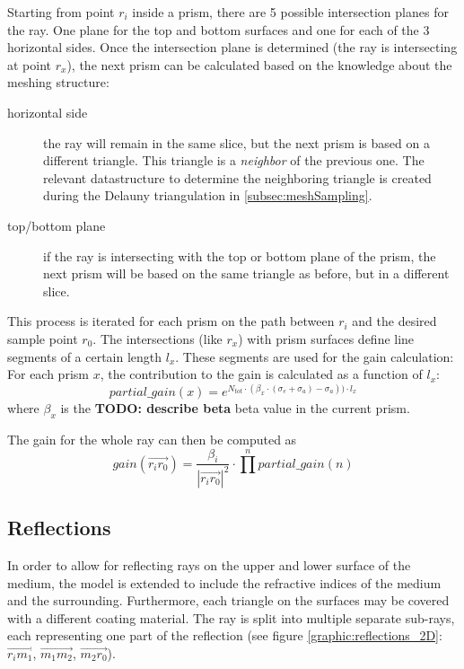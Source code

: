 Starting from point $r_i$ inside a prism, there are 5 possible intersection
planes for the ray. One plane for the top and bottom surfaces and one for each
of the 3 horizontal sides. Once the intersection plane is determined (the ray is
intersecting at point $r_x$), the next prism can be calculated based on the
knowledge about the meshing structure:

\begin{description}

  \item[horizontal side]
    the ray will remain in the same slice, but the next prism is based on a
    different triangle. This triangle is a \emph{neighbor} of the previous one.
    The relevant datastructure to determine the neighboring triangle is created
    during the Delauny triangulation in \ref{subsec:meshSampling}.

  \item[top/bottom plane]
    if the ray is intersecting with the top or bottom plane of the prism, the
    next prism will be based on the same triangle as before, but in a different
    slice.

\end{description}

This process is iterated for each prism on the path between $r_i$ and the
desired sample point $r_0$. The intersections (like $r_x$) with prism surfaces
define line segments of a certain length $l_x$. These segments are used for the
gain calculation: For each prism $x$, the contribution to the gain is calculated
as a function of $l_x$:
\[ 
  partial\_gain(x) = 
  e^{N_{tot} \cdot (\beta_x \cdot (\sigma_e + \sigma_a) - \sigma_a)) \cdot l_x}
\]
where $\beta_x$ is the \textbf{TODO: describe beta} beta value in the current
prism.

The gain for the whole ray can then be computed as
\[ 
  gain(\overrightarrow{r_ir_0}) =  
  \frac{\beta_i}{ |\overrightarrow{r_ir_0}|^2} \cdot \prod^npartial\_gain(n) 
\]



\subsection{Reflections}
\label{subsec:reflections}

In order to allow for reflecting rays on the upper and lower surface of the
medium, the model is extended to include the refractive indices of the medium
and the surrounding.  Furthermore, each triangle on the surfaces may be covered
with a different coating material. The ray is split into multiple separate
sub-rays, each representing one part of the reflection (see figure
\ref{graphic:reflections_2D}: $\overrightarrow{r_im_1}$,
$\overrightarrow{m_1m_2}$, $\overrightarrow{m_2r_0}$).


